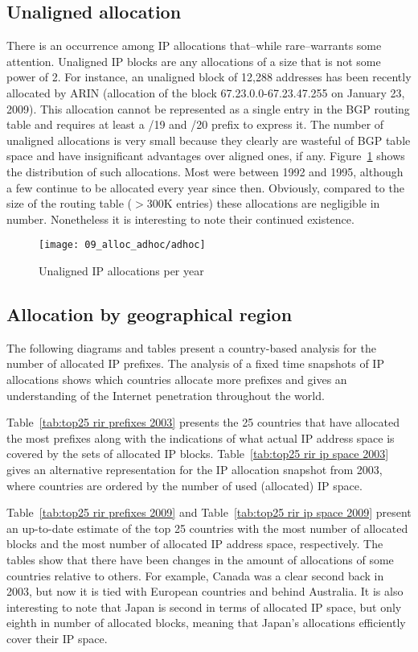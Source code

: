 \subsection{Unaligned allocation}

There is an occurrence among IP allocations that--while rare--warrants some
attention. Unaligned IP blocks are any allocations of a size that is not some
power of 2. For instance, an unaligned block of 12,288 addresses has been
recently allocated by ARIN (allocation of the block 67.23.0.0-67.23.47.255 on
January 23, 2009). This allocation cannot be represented as a single entry in
the BGP routing table and requires at least a /19 and /20 prefix to express it.
The number of unaligned allocations is very small because they clearly are
wasteful of BGP table space and have insignificant advantages over aligned
ones, if any. Figure~\ref{fig:unaligned IP allocations} shows the distribution
of such allocations. Most were between 1992 and 1995, although a few continue
to be allocated every year since then. Obviously, compared to the size of the
routing table ($>$300K entries) these allocations are negligible in number.
Nonetheless it is interesting to note their continued existence.

\begin{figure}[htbp]
 	\centering
 		\texttt{[image: 09\_alloc\_adhoc/adhoc]}
	\caption{Unaligned IP allocations per year}
 	\label{fig:unaligned IP allocations}
\end{figure}

\subsection{Allocation by geographical region}

The following diagrams and tables present a country-based analysis for the
number of allocated IP prefixes. The analysis of a fixed time snapshots of IP
allocations shows which countries allocate more prefixes and gives an
understanding of the Internet penetration throughout the world.

Table~\ref{tab:top25 rir prefixes 2003} presents the 25 countries that have
allocated the most prefixes along with the indications of what actual IP
address space is covered by the sets of allocated IP blocks.
Table~\ref{tab:top25 rir ip space 2003} gives an alternative representation
for the IP allocation snapshot from 2003, where countries are ordered by the number
of used (allocated) IP space.

Table~\ref{tab:top25 rir prefixes 2009} and Table~\ref{tab:top25 rir ip space
2009} present an up-to-date estimate of the top 25 countries with the most
number of allocated blocks and the most number of allocated IP address space,
respectively. The tables show that there have been changes in the amount of
allocations of some countries relative to others. For example, Canada was a
clear second back in 2003, but now it is tied with European countries and
behind Australia. It is also interesting to note that Japan is second in terms
of allocated IP space, but only eighth in number of allocated blocks, meaning
that Japan's allocations efficiently cover their IP space.

